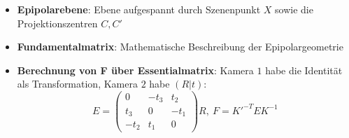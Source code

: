\begin{itemize}
\begin{itemize}
		\item \textbf{Epipolarebene}: Ebene aufgespannt durch Szenenpunkt $X$ sowie die Projektionszentren $C, C'$
		\item \textbf{Fundamentalmatrix}: Mathematische Beschreibung der Epipolargeometrie
		\item \textbf{Berechnung von F über Essentialmatrix}: Kamera $1$ habe die Identität als Transformation, Kamera $2$ habe $(R | t)$:
		$$
			E = \begin{pmatrix}
				0 & -t_3 & t_2 \\ t_3 & 0 & -t_1 \\ -t_2 & t_1 & 0
			\end{pmatrix}R,\ F = K'^{-T}EK^{-1}
		$$
	\end{itemize}
\end{itemize}